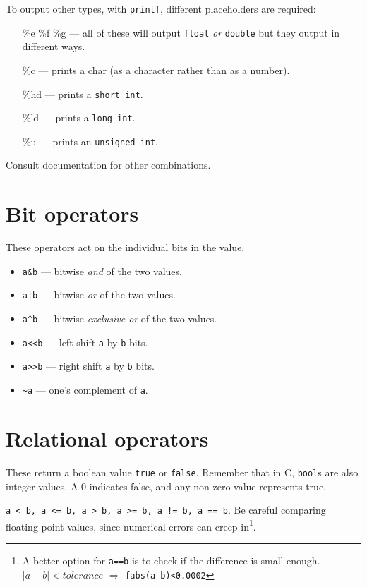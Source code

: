 To output other types, with \texttt{printf}, different placeholders are required:
\begin{itemize}
 \item [\%e \%f \%g] --- all of these will output \texttt{float} \emph{or} \texttt{double} but they output in different ways.
 \item [\%c] --- prints a char (as a character rather than as a number).
 \item [\%hd] --- prints a \texttt{short int}.
 \item [\%ld] --- prints a \texttt{long int}.
 \item [\%u]  --- prints an \texttt{unsigned int}.
\end{itemize}
Consult documentation for other combinations.

\section{Bit operators}

These operators act on the individual bits in the value.

\begin{itemize}
 \item \lstinline|a&b| --- bitwise \emph{and} of the two values.
 \item \lstinline:a|b: --- bitwise \emph{or} of the two values.
 \item \lstinline|a^b| --- bitwise \emph{exclusive or} of the two values.
 \item \lstinline|a<<b| --- left shift \texttt{a} by \texttt{b} bits.
 \item \lstinline|a>>b| --- right shift \texttt{a} by \texttt{b} bits.
 \item \lstinline|~a| --- one's complement of \texttt{a}.
\end{itemize}

\section{Relational operators}

These return a boolean value \texttt{true} or \texttt{false}.
Remember that in C, \texttt{bool}s are also integer values.
A 0 indicates false, and any non-zero value represents true.

\lstinline|a < b, a <= b, a > b, a >= b, a != b, a == b|.
Be careful comparing floating point values, since numerical errors can 
creep in\footnote{A better option for \texttt{a==b} is to check if the difference is small 
enough. $|a-b|<tolerance$ $\Rightarrow$ \lstinline!fabs(a-b)<0.0002!}.

